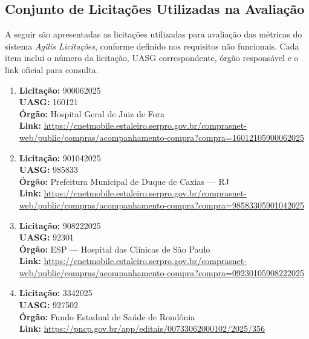 \begin{apendicesenv}

\chapter{Conjunto de Licitações Utilizadas na Avaliação}
\label{ap:licitacoes}

A seguir são apresentadas as licitações utilizadas para avaliação das métricas do sistema \textit{Agilis Licitações}, conforme definido nos requisitos não funcionais. Cada item inclui o número da licitação, UASG correspondente, órgão responsável e o link oficial para consulta.

{\sloppy
\begin{enumerate}
    \item \textbf{Licitação:} 900062025 \\
          \textbf{UASG:} 160121 \\
          \textbf{Órgão:} Hospital Geral de Juiz de Fora \\
          \textbf{Link:} \url{https://cnetmobile.estaleiro.serpro.gov.br/comprasnet-web/public/compras/acompanhamento-compra?compra=16012105900062025}

    \item \textbf{Licitação:} 901042025 \\
          \textbf{UASG:} 985833 \\
          \textbf{Órgão:} Prefeitura Municipal de Duque de Caxias — RJ \\
          \textbf{Link:} \url{https://cnetmobile.estaleiro.serpro.gov.br/comprasnet-web/public/compras/acompanhamento-compra?compra=98583305901042025}

    \item \textbf{Licitação:} 908222025 \\
          \textbf{UASG:} 92301 \\
          \textbf{Órgão:} ESP — Hospital das Clínicas de São Paulo \\
          \textbf{Link:} \url{https://cnetmobile.estaleiro.serpro.gov.br/comprasnet-web/public/compras/acompanhamento-compra?compra=09230105908222025}

    \item \textbf{Licitação:} 3342025 \\
          \textbf{UASG:} 927502 \\
          \textbf{Órgão:} Fundo Estadual de Saúde de Rondônia \\
          \textbf{Link:} \url{https://pncp.gov.br/app/editais/00733062000102/2025/356}


\end{enumerate}}
\end{apendicesenv}
